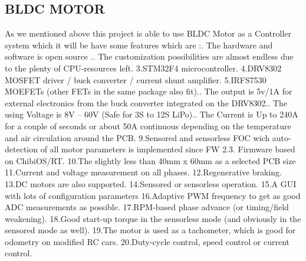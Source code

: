 \documentclass[11pt]{article}
\begin{document}
\subsection{BLDC MOTOR}
\label{BLDC MOTOR}
As we mentioned above this project is able to use BLDC Motor as a Controller system which it will be have some features which are :. The hardware and software is open source .. The customization possibilities are almost endless due to the plenty of CPU-resources left.\newline
3.STM32F4 microcontroller.\newline
4.DRV8302 MOSFET driver / buck converter / current shunt amplifier.\newline
5.IRFS7530 MOEFETs (other FETs in the same package also fit).. The output is  5v/1A for external electronics from the buck converter integrated on the DRV8302..  The using Voltage is 8V – 60V (Safe for 3S to 12S LiPo)..  The Current is  Up to 240A for a couple of seconds or about 50A continuous depending on the temperature and air circulation around the PCB.\newline
9.Sensored and sensorless FOC wich auto-detection of all motor parameters is implemented since FW 2.3.
Firmware based on ChibiOS/RT.\newline
10.The slightly less than 40mm x 60mm as a selected PCB size\newline
11.Current and voltage  measurement on all phases.\newline
12.Regenerative braking.\newline
13.DC motors are also supported.\newline
14.Sensored or sensorless operation.\newline
15.A GUI with lots of configuration parameters\newline
16.Adaptive PWM frequency to get as good ADC measurements as possible.\newline
17.RPM-based phase advance (or timing/field weakening).\newline
18.Good start-up torque in the sensorless mode (and obviously in the sensored mode as well).\newline
19.The motor is used as a tachometer, which is good for odometry on modified RC cars.\newline
20.Duty-cycle control, speed control or current control.\newline
\end{document}
